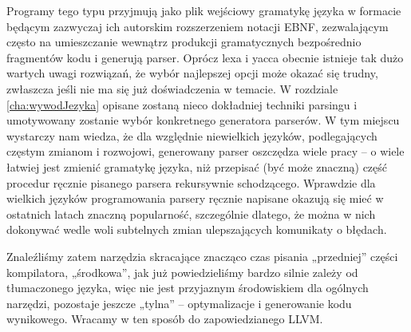 Programy tego typu przyjmują jako plik wejściowy gramatykę języka w formacie będącym zazwyczaj ich autorskim rozszerzeniem notacji EBNF, zezwalającym często na umieszczanie wewnątrz produkcji gramatycznych bezpośrednio fragmentów kodu i generują parser. Oprócz lexa i yacca obecnie istnieje tak dużo wartych uwagi rozwiązań, że wybór najlepszej opcji może okazać się trudny, zwłaszcza jeśli nie ma się już doświadczenia w temacie. W rozdziale \ref{cha:wywodJezyka} opisane zostaną nieco dokładniej techniki parsingu i umotywowany zostanie wybór konkretnego generatora parserów. W tym miejscu wystarczy nam wiedza, że dla względnie niewielkich języków, podlegających częstym zmianom i rozwojowi, generowany parser oszczędza wiele pracy – o wiele łatwiej jest zmienić gramatykę języka, niż przepisać (być może znaczną) część procedur ręcznie pisanego parsera rekursywnie schodzącego. Wprawdzie dla wielkich języków programowania parsery ręcznie napisane okazują się mieć w ostatnich latach znaczną popularność, szczególnie dlatego, że można w nich dokonywać wedle woli subtelnych zmian ulepszających komunikaty o błędach.

Znaleźliśmy zatem narzędzia skracające znacząco czas pisania „przedniej” części kompilatora, „środkowa”, jak już powiedzieliśmy bardzo silnie zależy od tłumaczonego języka, więc nie jest przyjaznym środowiskiem dla ogólnych narzędzi, pozostaje jeszcze „tylna” – optymalizacje i generowanie kodu wynikowego. Wracamy w ten sposób do zapowiedzianego LLVM. 

